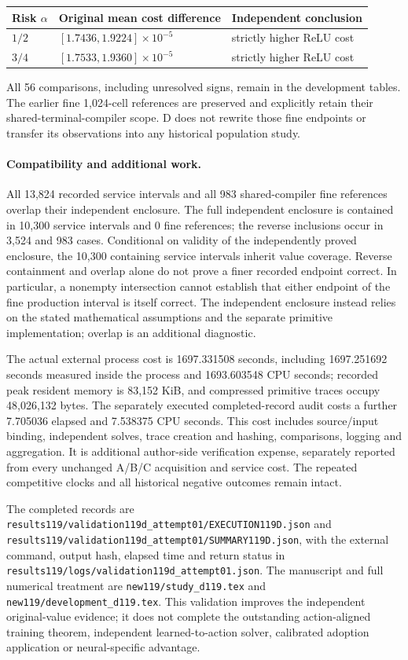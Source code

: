 \begin{center}\small
\begin{tabular}{lll}
\hline
Risk $\alpha$ & Original mean cost difference & Independent conclusion \\
\hline
$1/2$ & $[1.7436,1.9224]\times10^{-5}$ & strictly higher ReLU cost \\
$3/4$ & $[1.7533,1.9360]\times10^{-5}$ & strictly higher ReLU cost \\
\hline
\end{tabular}
\end{center}

All 56 comparisons, including unresolved signs, remain in the development
tables. The earlier fine 1,024-cell references are preserved and explicitly
retain their shared-terminal-compiler scope. D does not rewrite those fine
endpoints or transfer its observations into any historical population study.

\paragraph{Compatibility and additional work.}
All 13,824 recorded service intervals and all 983 shared-compiler fine references overlap their independent enclosure. The full independent enclosure is contained in 10,300 service intervals and 0 fine references; the reverse inclusions occur in 3,524 and 983 cases. Conditional on validity of the independently proved enclosure, the 10,300 containing service intervals inherit value coverage. Reverse containment and overlap alone do not prove a finer recorded endpoint correct. In particular, a nonempty intersection cannot establish that
either endpoint of the fine production interval is itself correct. The
independent enclosure instead relies on the stated mathematical assumptions
and the separate primitive implementation; overlap is an additional diagnostic.

The actual external process cost is 1697.331508 seconds, including 1697.251692 seconds measured inside the process and 1693.603548 CPU seconds; recorded peak resident memory is 83,152 KiB, and compressed primitive traces occupy 48,026,132 bytes. The separately executed completed-record audit costs a further 7.705036 elapsed and 7.538375 CPU seconds. This cost includes source/input binding, independent solves, trace
creation and hashing, comparisons, logging and aggregation. It is additional
author-side verification expense, separately reported from every unchanged
A/B/C acquisition and service cost. The repeated competitive clocks and
all historical negative outcomes remain intact.

The completed records are
\nolinkurl{results119/validation119d_attempt01/EXECUTION119D.json} and
\nolinkurl{results119/validation119d_attempt01/SUMMARY119D.json}, with the
external command, output hash, elapsed time and return status in
\nolinkurl{results119/logs/validation119d_attempt01.json}. The manuscript
and full numerical treatment are \nolinkurl{new119/study_d119.tex} and
\nolinkurl{new119/development_d119.tex}. This validation improves the
independent original-value evidence; it does not complete the outstanding
action-aligned training theorem, independent learned-to-action solver,
calibrated adoption application or neural-specific advantage.
